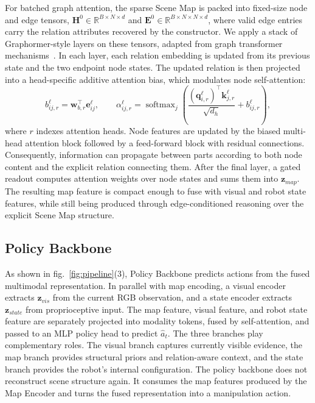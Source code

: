 For batched graph attention, the sparse Scene Map is packed into fixed-size node and edge tensors, $\mathbf{H}^0 \in \mathbb{R}^{B \times N \times d}$ and $\mathbf{E}^0 \in \mathbb{R}^{B \times N \times N \times d}$, where valid edge entries carry the relation attributes recovered by the constructor.
We apply a stack of Graphormer-style layers on these tensors, adapted from graph transformer mechanisms~\cite{Surveygraphtransformer, graphormer, rampasek2022GPS}. In each layer, each relation embedding is updated from its previous state and the two endpoint node states. The updated relation is then projected into a head-specific additive attention bias, which modulates node self-attention:
\begin{equation}
b_{ij,r}^{\ell} = \mathbf{w}_{b,r}^\top \mathbf{e}_{ij}^{\ell}, \qquad
\alpha_{ij,r}^{\ell} = \operatorname{softmax}_j\!\left(
\frac{(\mathbf{q}_{i,r}^{\ell})^\top \mathbf{k}_{j,r}^{\ell}}{\sqrt{d_h}} + b_{ij,r}^{\ell}
\right),
\end{equation}
where $r$ indexes attention heads. Node features are updated by the biased multi-head attention block followed by a feed-forward block with residual connections. Consequently, information can propagate between parts according to both node content and the explicit relation connecting them.
After the final layer, a gated readout computes attention weights over node states and sums them into $\mathbf{z}_{map}$. The resulting map feature is compact enough to fuse with visual and robot state features, while still being produced through edge-conditioned reasoning over the explicit Scene Map structure.

\subsection{Policy Backbone}
\label{sec:policy_backbone}

As shown in fig.~\ref{fig:pipeline}(3), Policy Backbone predicts actions from the fused multimodal representation. In parallel with map encoding, a visual encoder extracts $\mathbf{z}_{vis}$ from the current RGB observation, and a state encoder extracts $\mathbf{z}_{state}$ from proprioceptive input. The map feature, visual feature, and robot state feature are separately projected into modality tokens, fused by self-attention, and passed to an MLP policy head to predict $\hat{a}_t$.
The three branches play complementary roles. The visual branch captures currently visible evidence, the map branch provides structural priors and relation-aware context, and the state branch provides the robot's internal configuration. The policy backbone does not reconstruct scene structure again. It consumes the map features produced by the Map Encoder and turns the fused representation into a manipulation action.

